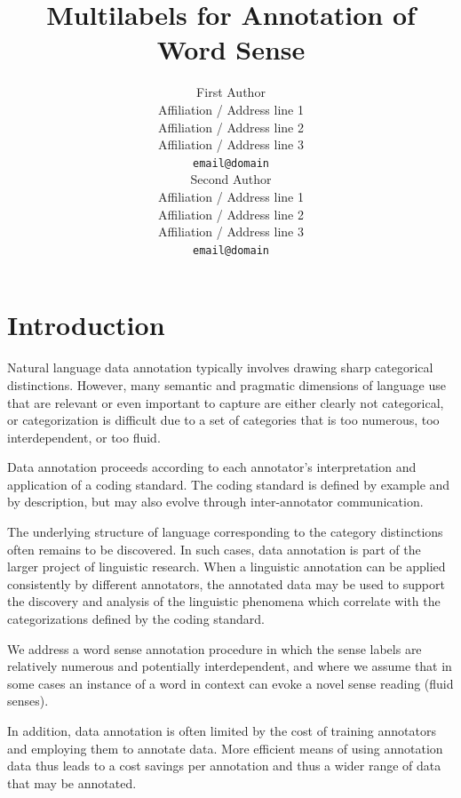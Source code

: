 \documentclass[11pt]{article}
\title{Multilabels for Annotation of Word Sense}
\author{First Author \\
   Affiliation / Address line 1 \\
   Affiliation / Address line 2 \\
   Affiliation / Address line 3 \\
  {\tt email@domain} \\\And
   Second Author \\
   Affiliation / Address line 1 \\
   Affiliation / Address line 2 \\
   Affiliation / Address line 3 \\
   {\tt email@domain} 
\\}
\date{}
\begin{document}
\maketitle
\begin{abstract}

\end{abstract}

\section{Introduction} %

Natural language data annotation typically involves drawing sharp
categorical distinctions. However, many semantic and pragmatic
dimensions of language use that are relevant or even important to
capture are either clearly not categorical, or categorization is
difficult due to a set of categories that is too numerous, too
interdependent, or too fluid.

Data annotation proceeds according to each annotator's interpretation
and application of a coding standard. The coding standard is defined
by example and by description, but may also evolve through
inter-annotator communication.

The underlying structure of language corresponding to the category
distinctions often remains to be discovered. In such cases, data
annotation is part of the larger project of linguistic research. When
a linguistic annotation can be applied consistently by different
annotators, the annotated data may be used to support the discovery
and analysis of the linguistic phenomena which correlate with the
categorizations defined by the coding standard.

We address a word sense annotation procedure in which the sense labels
are relatively numerous and potentially interdependent, and where we
assume that in some cases an instance of a word in context can evoke a
novel sense reading (fluid senses).

In addition, data annotation is often limited by the cost of training
annotators and employing them to annotate data. More efficient means
of using annotation data thus leads to a cost savings per annotation
and thus a wider range of data that may be annotated.
\end{document}
